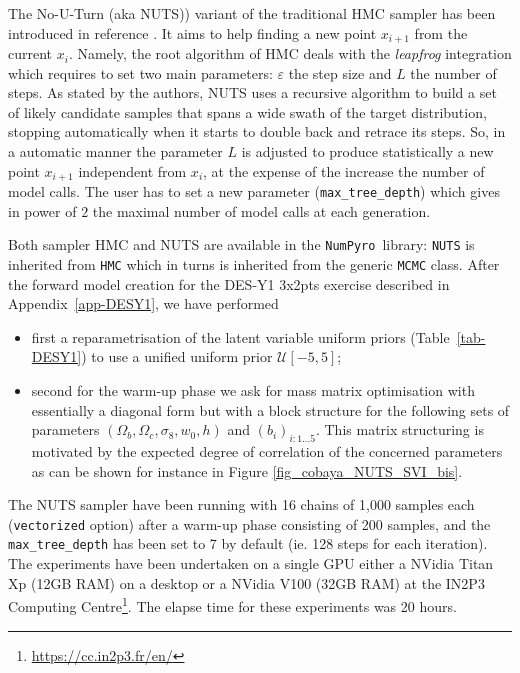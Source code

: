 \documentclass[twocolumn,twocolappendix,nofootinbib,iop]{openjournal}
\newcommand{\numpyro}{\texttt{NumPyro}}
\begin{document}
The No-U-Turn (aka NUTS))  variant of the traditional HMC sampler has been introduced in reference \citep{nuts}. It aims to help finding a new point  $x_{i+1}$ from  the current $x_i$. Namely, the root algorithm of HMC deals with the \textit{leapfrog} integration which requires to set two main parameters: $\varepsilon$ the step size and $L$ the number of steps. As stated by the authors, NUTS  uses a recursive algorithm to build a set of likely candidate samples that spans a wide swath of the target distribution, stopping automatically when it starts to double back and retrace its steps. So, in a automatic manner the parameter $L$ is adjusted to produce statistically  a new point $x_{i+1}$ independent from $x_i$, at the expense of the increase the number of model calls. The user has to set a new  parameter  (\texttt{max\_tree\_depth}) which gives in power of $2$ the maximal number of model calls at each generation.

Both sampler HMC and NUTS are available in the \numpyro\ library: \texttt{NUTS} is inherited from \texttt{HMC} which in turns is inherited from the generic \texttt{MCMC} class.  After the forward model creation for the DES-Y1 3x2pts exercise described in Appendix~\ref{app-DESY1}, we have performed 
\begin{itemize}
    \item first a reparametrisation of the latent variable uniform priors (Table~\ref{tab-DESY1}) to use a unified uniform prior $\mathcal{U}[-5,5]$;
    \item second for the warm-up phase we ask for mass matrix optimisation with essentially a diagonal form but with a block structure for the following sets of parameters $(\Omega_b,\Omega_c,\sigma_8,w_0,h)$ and $(b_i)_{i:1\dots5}$. This matrix structuring is motivated by the expected degree of correlation of the concerned parameters as can be shown for instance in Figure \ref{fig_cobaya_NUTS_SVI_bis}.
\end{itemize}
The NUTS sampler have been running with 16 chains of 1,000 samples each (\texttt{vectorized} option) after a warm-up phase consisting of 200 samples, and the \texttt{max\_tree\_depth} has been set to 7 by default (ie. 128 steps for each iteration). The experiments have been undertaken on a single GPU either a NVidia Titan Xp (12GB RAM) on a desktop or a NVidia V100 (32GB RAM) at the IN2P3 Computing Centre\footnote{\url{https://cc.in2p3.fr/en/}}. The elapse time for these experiments was 20 hours.
\end{document}
